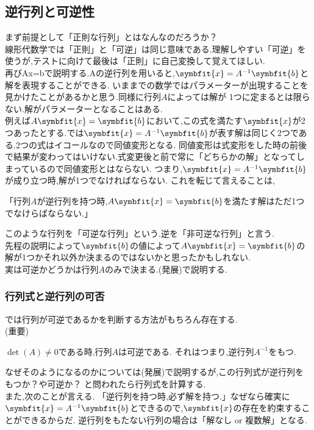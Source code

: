 \subsection{逆行列と可逆性}
まず前提として「正則な行列」とはなんなのだろうか？\\
線形代数学では「正則」と「可逆」は同じ意味である.理解しやすい「可逆」を使うが,テストに向けて最後は「正則」に自己変換して覚えてほしい.\\
再びAx=bで説明する.Aの逆行列を用いると,$\symbfit{x}=A^{-1}\symbfit{b}$と解を表現することができる.
いままでの数学ではパラメーターが出現することを見かけたことがあるかと思う.同様に行列$A$によっては解が
1つに定まるとは限らない.解がパラメーターとなることはある.\\
例えば$A\symbfit{x}=\symbfit{b}$において,この式を満たす$\symbfit{x}$が2つあったとする.では$\symbfit{x}=A^{-1}\symbfit{b}$が表す解は同じく2つである.2つの式はイコールなので同値変形となる.
同値変形は式変形をした時の前後で結果が変わってはいけない.式変更後と前で常に「どちらかの解」となってしまっているので同値変形とはならない.
つまり,$\symbfit{x}=A^{-1}\symbfit{b}$が成り立つ時,解が1つでなければならない.
これを転じて言えることは,
\begin{center}
    「行列$A$が逆行列を持つ時,$A\symbfit{x}=\symbfit{b}$を満たす解はただ1つでなけらばならない.」    
\end{center}
このような行列を「可逆な行列」という.逆を「非可逆な行列」と言う.\\

先程の説明によって$\symbfit{b}$の値によって$A\symbfit{x}=\symbfit{b}$の解が1つかそれ以外か決まるのではないかと思ったかもしれない.\\
実は可逆かどうかは行列$A$のみで決まる.(発展)で説明する.

\subsubsection{行列式と逆行列の可否}
では行列が可逆であるかを判断する方法がもちろん存在する.\\
(重要)
\begin{center}
    $\det(A) \neq 0$である時,行列$A$は可逆である.
    それはつまり,逆行列$A^{-1}$をもつ.
\end{center}
なぜそのようになるのかについては(発展)で説明するが,この行列式が逆行列をもつか？や可逆か？
と問われたら行列式を計算する.\\
また,次のことが言える.
「逆行列を持つ時,必ず解を持つ.」なぜなら確実に$\symbfit{x}=A^{-1}\symbfit{b}$とできるので,$\symbfit{x}$の存在を約束することができるからだ.
逆行列をもたない行列の場合は「解なし or 複数解」となる.


